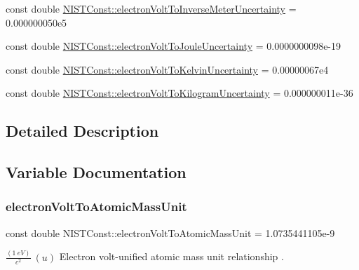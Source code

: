 \begin{DoxyCompactItemize}
const double \hyperlink{group___electron_volt_gab410911d31f242cb940fe960d19b1ddb}{N\+I\+S\+T\+Const\+::electron\+Volt\+To\+Inverse\+Meter\+Uncertainty} = 0.\+000000050e5
\item 
const double \hyperlink{group___electron_volt_ga32594652a8bac45e8676551612471385}{N\+I\+S\+T\+Const\+::electron\+Volt\+To\+Joule\+Uncertainty} = 0.\+0000000098e-\/19
\item 
const double \hyperlink{group___electron_volt_ga6754c9f090abf4bff80621978bf85eb1}{N\+I\+S\+T\+Const\+::electron\+Volt\+To\+Kelvin\+Uncertainty} = 0.\+00000067e4
\item 
const double \hyperlink{group___electron_volt_ga77aec1f5b68dd74739fe268fa4362a85}{N\+I\+S\+T\+Const\+::electron\+Volt\+To\+Kilogram\+Uncertainty} = 0.\+000000011e-\/36
\end{DoxyCompactItemize}


\subsection{Detailed Description}


\subsection{Variable Documentation}
\mbox{\label{group___electron_volt_gabd56c1195e7ce2bb9c314e88b43e30ab}} 
\subsubsection{\texorpdfstring{electron\+Volt\+To\+Atomic\+Mass\+Unit}{electronVoltToAtomicMassUnit}}
{\footnotesize\ttfamily const double N\+I\+S\+T\+Const\+::electron\+Volt\+To\+Atomic\+Mass\+Unit = 1.\+0735441105e-\/9}

$\frac{(1\ eV)}{c^2}\ (u)$ Electron volt-\/unified atomic mass unit relationship . \mbox{\label{group___electron_volt_ga0f93985ef9b7a71e0c1e6172d6d041a5}} 
